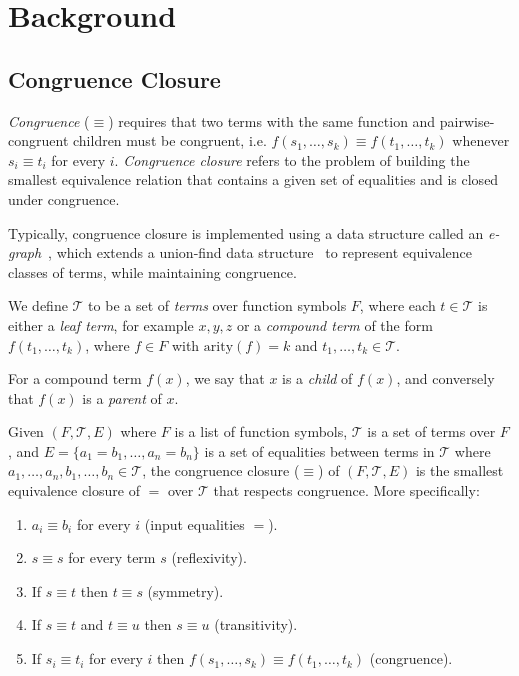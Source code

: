 \section{Background}
\label{sec:background}


\subsection{Congruence Closure}

\emph{Congruence} ($\equiv$) requires that two terms with the same function
and pairwise-congruent children must be congruent, i.e. $f(s_1,
\ldots, s_k) \equiv f(t_1, \ldots, t_k)$ whenever $s_i \equiv t_i$ for every
$i$. \emph{Congruence closure} refers to the problem of building the smallest
equivalence relation that contains a given set of equalities and is closed under
congruence.

Typically, congruence closure is implemented using a data structure called an
\emph{e-graph}~\cite{egraphs}, which extends a union-find
data structure~\cite{unionfindtarjan} to represent equivalence classes of terms,
while maintaining congruence.


\begin{definition}[Terms]
    We define $\mathcal{T}$ to be a set of \emph{terms} over function symbols
    $F$, where
    each $t\in \mathcal{T}$ is either a \emph{leaf term}, for example $x, y, z$
    or a
    \emph{compound term} of the form $f(t_1, \ldots, t_k)$, where $f \in F$
    with $\text{arity}(f) = k$ and $t_1, \ldots, t_k \in \mathcal{T}$.
\end{definition}

For a compound term $f(x)$, we say that $x$ is a \emph{child} of $f(x)$,
and conversely that $f(x)$ is a \emph{parent} of $x$.

\begin{definition}
    \label{def:cc}
    Given $(F, \mathcal{T}, E)$ where $F$ is a list of function symbols,
    $\mathcal{T}$ is a set of
    terms over $F$, and $E = \{a_1 = b_1, \ldots, a_n = b_n\}$ is a set of
    equalities between terms in $\mathcal{T}$ where $a_1, \ldots, a_n, b_1,
    \ldots, b_n
    \in \mathcal{T}$, the congruence closure ($\equiv$) of $(F, \mathcal{T}, E)$
    is the smallest
    equivalence closure of $=$ over $\mathcal{T}$ that respects congruence. More
    specifically:
    \begin{enumerate}
        \item $a_i \equiv b_i$ for every $i$ (input equalities $=$).
        \item $s \equiv s$ for every term $s$ (reflexivity).
        \item If $s \equiv t$ then $t \equiv s$ (symmetry).
        \item If $s \equiv t$ and $t \equiv u$ then $s \equiv u$ (transitivity).
        \item If $s_i \equiv t_i$ for every $i$ then $f(s_1, \ldots, s_k) \equiv
        f(t_1, \ldots, t_k)$ (congruence).     
    \end{enumerate}
\end{definition}


